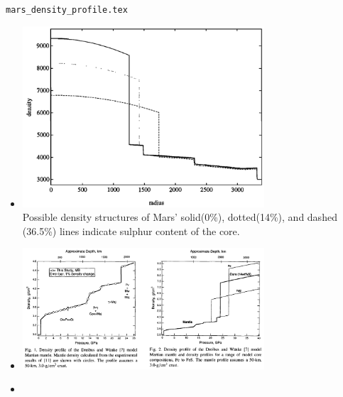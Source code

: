 \begin{flushright} {\tiny {\color{gray} \tt mars\_density\_profile.tex}} \end{flushright}

\begin{itemize}



\item {}

\begin{center}
\includegraphics[width=9cm]{images/mars/density/hard98}\\
{\captionfont Possible density structures of Mars' solid(0\%), 
dotted(14\%), and dashed (36.5\%) lines indicate sulphur content of the core.}
\end{center}

\item {}

\begin{center}
\includegraphics[width=9cm]{images/mars/density/befe98}
\end{center}

\item {}


\end{itemize}
